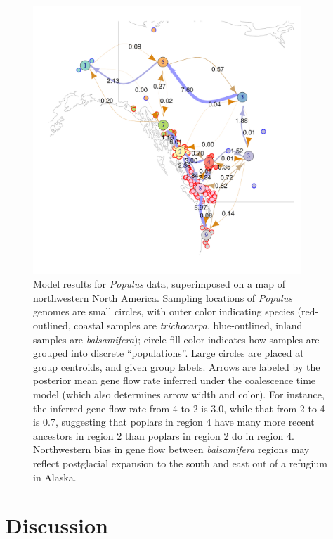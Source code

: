 \documentclass{article}
\begin{document}
\begin{figure}
\centering
    \includegraphics[width=0.9\textwidth]{poplars/grid_populus_map}
    \caption{
        Model results for \textit{Populus} data,
        superimposed on a map of northwestern North America.
        Sampling locations of \textit{Populus} genomes are small circles,
        with outer color indicating species 
        (red-outlined, coastal samples are \textit{trichocarpa}, 
        blue-outlined, inland samples are \textit{balsamifera});
        circle fill color indicates how samples are grouped into discrete ``populations''.
        Large circles are placed at group centroids, and given group labels.
        Arrows are labeled by the posterior mean gene flow rate inferred under
        the coalescence time model (which also determines arrow width and color).
        For instance, the inferred gene flow rate from 4 to 2 is 3.0,
        while that from 2 to 4 is 0.7,
        suggesting that poplars in region 4
        have many more recent ancestors in region 2
        than poplars in region 2 do in region 4.
        Northwestern bias in gene flow between \textit{balsamifera} regions
        may reflect postglacial expansion to the south and east out of a refugium in Alaska.
        \label{fig:poplar_results}
    }
\end{figure}

\section*{Discussion}
\end{document}
